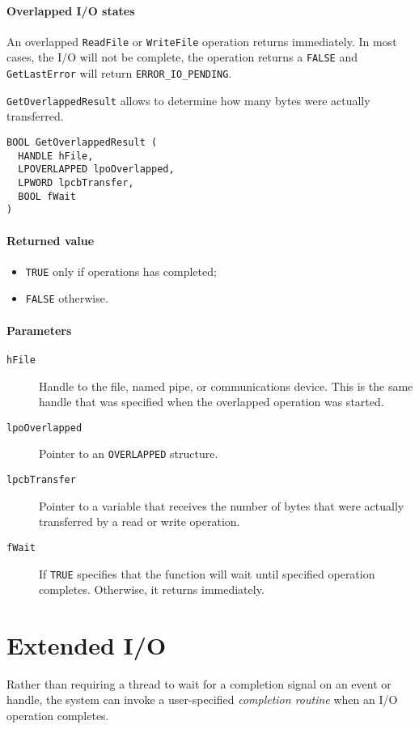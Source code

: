 \paragraph{Overlapped I/O states}
An overlapped \texttt{ReadFile} or \texttt{WriteFile} operation returns immediately. In most cases, the I/O will not be complete, the operation returns a \texttt{FALSE} and \texttt{GetLastError} will return \texttt{ERROR\_IO\_PENDING}.

\texttt{GetOverlappedResult} allows to determine how many bytes were actually transferred.

\begin{verbatim}
BOOL GetOverlappedResult (
  HANDLE hFile,
  LPOVERLAPPED lpoOverlapped,
  LPWORD lpcbTransfer,
  BOOL fWait
)
\end{verbatim}

\paragraph{Returned value}
\begin{itemize}
\item \texttt{TRUE} only if operations has completed;
\item \texttt{FALSE} otherwise.
\end{itemize}

\paragraph{Parameters}
\begin{description}
\item [\texttt{hFile}] Handle to the file, named pipe, or communications device. This is the same handle that was specified when the overlapped operation was started.
\item [\texttt{lpoOverlapped}] Pointer to an \texttt{OVERLAPPED} structure.
\item [\texttt{lpcbTransfer}] Pointer to a variable that receives the number of bytes that were actually transferred by a read or write operation.
\item [\texttt{fWait}] If \texttt{TRUE} specifies that the function will wait until specified operation completes. Otherwise, it returns immediately.
\end{description}

\section{Extended I/O}
Rather than requiring a thread to wait for a completion signal on an event or handle, the system can invoke a user-specified \emph{completion routine} when an I/O operation completes.


